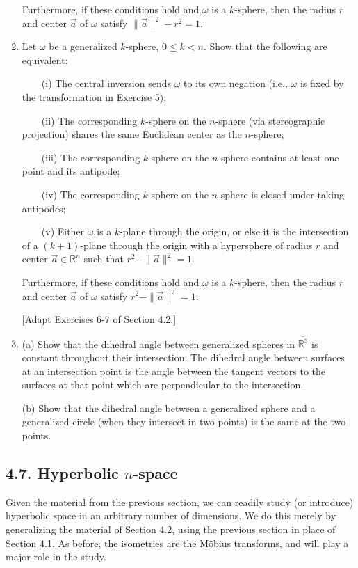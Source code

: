 \documentclass[leqno]{book}
\begin{document}
\begin{enumerate}
Furthermore, if these conditions hold and $\omega$ is a $k$-sphere, then the radius $r$ and center $\vec a$ of $\omega$ satisfy $\|\vec a\|^2-r^2=1$.  

\item Let $\omega$ be a generalized $k$-sphere, $0\leqslant k<n$.  Show that the following are equivalent:

~~~~(i) The central inversion sends $\omega$ to its own negation (i.e., $\omega$ is fixed by the transformation in Exercise 5);

~~~~(ii) The corresponding $k$-sphere on the $n$-sphere (via stereographic projection) shares the same Euclidean center as the $n$-sphere;

~~~~(iii) The corresponding $k$-sphere on the $n$-sphere contains at least one point and its antipode;

~~~~(iv) The corresponding $k$-sphere on the $n$-sphere is closed under taking antipodes;

~~~~(v) Either $\omega$ is a $k$-plane through the origin, or else it is the intersection of a $(k+1)$-plane through the origin with a hypersphere of radius $r$ and center $\vec a\in\mathbb R^n$ such that $r^2-\|\vec a\|^2=1$.

Furthermore, if these conditions hold and $\omega$ is a $k$-sphere, then the radius $r$ and center $\vec a$ of $\omega$ satisfy $r^2-\|\vec a\|^2=1$.

[Adapt Exercises 6-7 of Section 4.2.]

\item (a) Show that the dihedral angle between generalized spheres in $\overline{\mathbb R^3}$ is constant throughout their intersection.  The dihedral angle between surfaces at an intersection point is the angle between the tangent vectors to the surfaces at that point which are perpendicular to the intersection.

(b) Show that the dihedral angle between a generalized sphere and a generalized circle (when they intersect in two points) is the same at the two points.
\end{enumerate}

\subsection*{4.7. Hyperbolic $n$-space}
Given the material from the previous section, we can readily study (or introduce) hyperbolic space in an arbitrary number of dimensions.  We do this merely by generalizing the material of Section 4.2, using the previous section in place of Section 4.1.  As before, the isometries are the M\"obius transforms, and will play a major role in the study.
\end{document}
